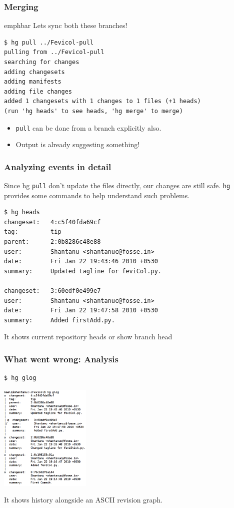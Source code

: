 \documentclass[14pt,compress]{beamer}
\newcommand{\emphbar}[1]
{\begin{beamercolorbox}[rounded=true]{emphbar} 
      {#1}
 \end{beamercolorbox}
}
\newcommand{\typ}[1]{\lstinline{#1}}
\begin{document}
\begin{frame}[fragile]
  \frametitle{Merging}
  \emphbar{Lets sync both these branches!}
  \begin{lstlisting}
$ hg pull ../Fevicol-pull
pulling from ../Fevicol-pull
searching for changes
adding changesets
adding manifests
adding file changes
added 1 changesets with 1 changes to 1 files (+1 heads)
(run 'hg heads' to see heads, 'hg merge' to merge)    
  \end{lstlisting} %
  \begin{itemize}
  \item \typ{pull} can be done from a branch explicitly also.
  \item Output is already suggesting something!
  \end{itemize}  
\end{frame}

\begin{frame}[fragile]
  \frametitle{Analyzing events in detail}
  Since hg \typ{pull} don't update the files directly, our changes are still safe. \typ{hg} provides some commands to help understand such problems.
\begin{tiny}
  \begin{lstlisting}
$ hg heads
changeset:   4:c5f40fda69cf
tag:         tip
parent:      2:0b8286c48e88
user:        Shantanu <shantanuc@fosse.in>
date:        Fri Jan 22 19:43:46 2010 +0530
summary:     Updated tagline for feviCol.py.

changeset:   3:60edf0e499e7
user:        Shantanu <shantanuc@fosse.in>
date:        Fri Jan 22 19:47:58 2010 +0530
summary:     Added firstAdd.py.
  \end{lstlisting} %
\end{tiny}
  It shows current repository heads or show branch head
\end{frame}

\begin{frame}[fragile]
  \frametitle{What went wrong: Analysis}
    \begin{lstlisting}
$ hg glog    
  \end{lstlisting} %
  \begin{center}
  \includegraphics[height=2in]{glog}  
  \end{center}  
  It shows history alongside an ASCII revision graph.  
\end{frame}
\end{document}
